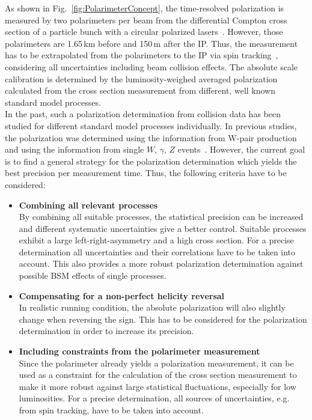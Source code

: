 \documentclass[a4paper]{article}
\begin{document}
As shown in Fig.~\ref{fig:PolarimeterConcept}, the time-resolved polarization is measured by two polarimeters per beam from the differential Compton cross section of a particle bunch with a circular polarized lasers~\cite{polarimeter}. However, those polarimeters are 1.65\,km before and 150\,m after the IP. Thus, the measurement has to be extrapolated from the polarimeters to the IP via spin tracking~\cite{spintracking}, considering all uncertainties including beam collision effects. The absolute scale calibration is determined by the luminosity-weighed averaged polarization calculated from the cross section measurement from different, well known standard model processes.\\
In the past, such a polarization determination from collision data has been studied for different standard model processes individually. In previous studies, the polarization was determined using the information from W-pair production~\cite{wpairstudy} and using the information from single $W$, $\gamma$, $Z$ events~\cite{singlebosonstudy}. However, the current goal is to find a general strategy for the polarization determination which yields the best precision per measurement time. Thus, the following criteria have to be considered:\\
\begin{itemize}
	\item \textbf{Combining all relevant processes}\\
	By combining all suitable processes, the statistical precision can be increased and different systematic uncertainties give a better control. Suitable processes exhibit a large left-right-asymmetry and a high cross section. For a precise determination all uncertainties and their correlations have to be taken into account. This also provides a more robust polarization determination against possible BSM effects of single processes.\\
	\item \textbf{Compensating for a non-perfect helicity reversal}\\
	In realistic running condition, the absolute polarization will also slightly change when reversing the sign. This has to be considered for the polarization determination in order to increase its precision.\\\newpage
	\item \textbf{Including constraints from the polarimeter measurement}\\
	Since the polarimeter already yields a polarization measurement, it can be used as a constraint for the calculation of the cross section measurement to make it more robust against large statistical fluctuations, especially for low luminosities. For a precise determination, all sources of uncertainties, e.g. from spin tracking, have to be taken into account.\\
\end{itemize}
\end{document}
